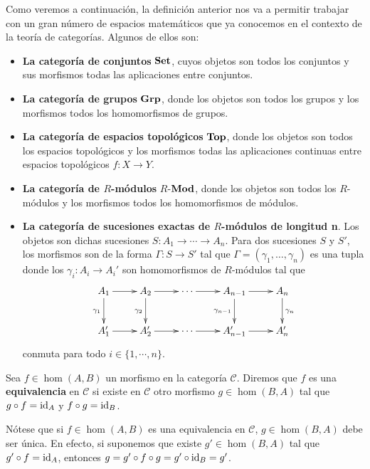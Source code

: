 \begin{ejemplo}
	Como veremos a continuación, la definición anterior nos va a permitir trabajar
	con un gran número de espacios matemáticos que ya conocemos en el contexto de
	la teoría de categorías. Algunos de ellos son:
	\begin{itemize}
		\item \textbf{La categoría de conjuntos} \(\mathbf{Set}\), cuyos objetos son todos
		los conjuntos y sus morfismos todas las aplicaciones entre conjuntos.
		
		\item \textbf{La categoría de grupos} \(\mathbf{Grp}\), donde los objetos son todos
		los grupos y los morfismos todos los homomorfismos de grupos.
		
		\item \textbf{La categoría de espacios topológicos} \(\mathbf{Top}\), donde los objetos
		son todos los espacios topológicos y los morfismos todas las aplicaciones continuas
		entre espacios topológicos \(f: X \rightarrow Y\).
		
		\item \textbf{La categoría de \(R\)-módulos} \(R\)-\(\mathbf{Mod}\), donde los objetos
		son todos los \(R\)-módulos y los morfismos todos los homomorfismos de módulos.
		
		\item \textbf{La categoría de sucesiones exactas de \(R\)-módulos de longitud
			n}. Los objetos son dichas sucesiones \(S: A_{1}\rightarrow \cdots \rightarrow
		A_{n}\). Para dos sucesiones \(S\) y \(S'\), los morfismos son de la forma \(\Gamma
		: S \rightarrow S'\) tal que \(\Gamma = (\gamma_{1}, \ldots, \gamma_{n})\) es
		una tupla donde los \(\gamma_{i}: A_{i}\rightarrow A_{i}'\) son homomorfismos
		de \(R\)-módulos tal que
		\begin{equation}
			\label{exactseqcat}\xymatrix{ A_1 \ar[r] \ar[d]_{\gamma_1} & A_2 \ar[r] \ar[d]_{\gamma_2} & \cdots \ar[r] & A_{n-1} \ar[r] \ar[d]_{\gamma_{n-1}} & A_n \ar[d]^{\gamma_n} \\ A'_1 \ar[r] & A'_2 \ar[r] & \cdots \ar[r] & A'_{n-1} \ar[r] & A'_n }
		\end{equation}
		conmuta para todo \(i \in \{ 1, \cdots, n \}\).
	\end{itemize}
\end{ejemplo}

\begin{definicion}
	Sea \(f \in \hom(A,B)\) un morfismo en la categoría \(\mathcal{C}\). Diremos que
	\(f\) es una \textbf{equivalencia} en \(\mathcal{C}\) si existe en \(\mathcal{C}\) otro
	morfismo \(g \in \hom(B,A)\) tal que \(g \circ f = \operatorname{id}_{A}\) y \(f \circ g = \operatorname{id}_{B}\).
\end{definicion}
\begin{observacion}
	Nótese que si \(f \in \hom(A,B)\) es una equivalencia en \(\mathcal{C}\),
	\(g \in \hom(B,A)\) debe ser única. En efecto, si suponemos que existe
	\(g' \in \hom(B,A)\) tal que \(g' \circ f = \operatorname{id}_{A}\), entonces \(g = g'\circ f \circ
	g = g' \circ \operatorname{id}_{B}= g'\).
\end{observacion}

